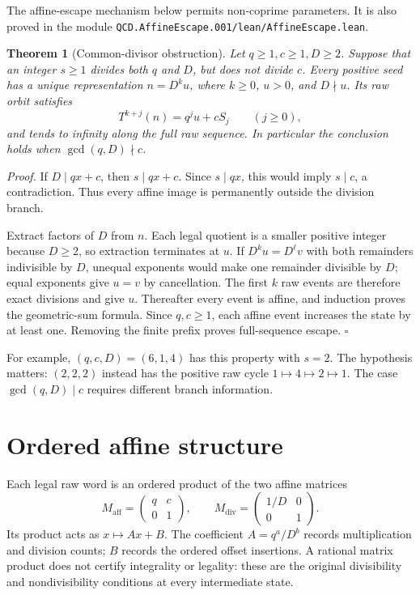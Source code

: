 \documentclass[11pt,letterpaper]{article}
\newtheorem{theorem}{Theorem}
\newenvironment{proof}{\noindent\textit{Proof.}}{\hfill\(\square\)}
\begin{document}
The affine-escape mechanism below permits non-coprime parameters.
It is also proved in the module
\nolinkurl{QCD.AffineEscape.001/lean/AffineEscape.lean}.

\begin{theorem}[Common-divisor obstruction]
\label{thm:noncoprime}
Let \(q\ge1,c\ge1,D\ge2\). Suppose that an integer \(s\ge1\) divides
both \(q\) and \(D\), but does not divide \(c\).
Every positive seed has a unique representation \(n=D^k u\), where
\(k\ge0\), \(u>0\), and \(D\nmid u\). Its raw orbit satisfies
\[
T^{k+j}(n)=q^j u+cS_j\qquad(j\ge0),
\]
and tends to infinity along the full raw sequence.
In particular the conclusion holds when \(\gcd(q,D)\nmid c\).
\end{theorem}

\begin{proof}
If \(D\mid qx+c\), then \(s\mid qx+c\). Since \(s\mid qx\), this
would imply \(s\mid c\), a contradiction. Thus every affine image
is permanently outside the division branch.

Extract factors of \(D\) from \(n\). Each legal quotient is a smaller
positive integer because \(D\ge2\), so extraction terminates at \(u\).
If \(D^k u=D^\ell v\) with both remainders indivisible by \(D\), unequal
exponents would make one remainder divisible by \(D\); equal exponents
give \(u=v\) by cancellation. The first \(k\) raw events are therefore
exact divisions and give \(u\). Thereafter every event is affine,
and induction proves the geometric-sum formula. Since \(q,c\ge1\),
each affine event increases the state by at least one. Removing the
finite prefix proves full-sequence escape.
\end{proof}

For example, \((q,c,D)=(6,1,4)\) has this property with \(s=2\).
The hypothesis matters: \((2,2,2)\) instead has the positive raw cycle
\(1\mapsto4\mapsto2\mapsto1\).
The case \(\gcd(q,D)\mid c\) requires different branch information.

\section{Ordered affine structure}

Each legal raw word is an ordered product of the two affine matrices
\[
M_{\mathrm{aff}}=
\begin{pmatrix}q&c\\0&1\end{pmatrix},
\qquad
M_{\mathrm{div}}=
\begin{pmatrix}1/D&0\\0&1\end{pmatrix}.
\]
Its product acts as \(x\mapsto Ax+B\).
The coefficient \(A=q^a/D^b\) records multiplication and division
counts; \(B\) records the ordered offset insertions.
A rational matrix product does not certify integrality or legality:
these are the original divisibility and nondivisibility conditions
at every intermediate state.
\end{document}
